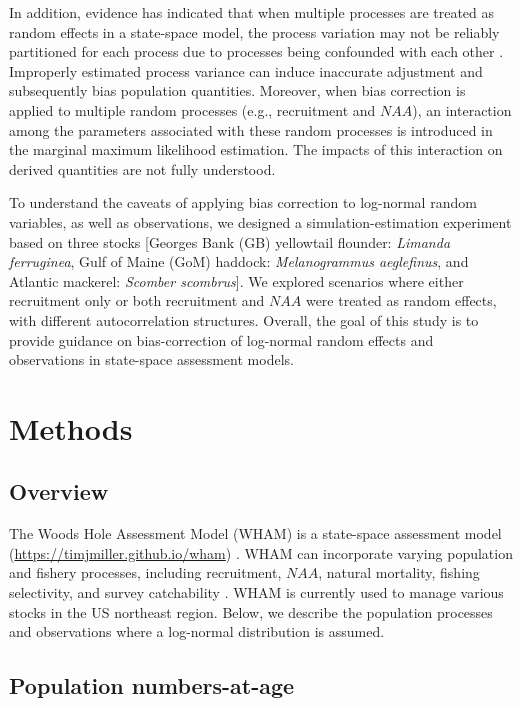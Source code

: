 \documentclass[
  12pt,
]{article}
\begin{document}
In addition, evidence has indicated that when multiple processes are
treated as random effects in a state-space model, the process variation
may not be reliably partitioned for each process due to processes being
confounded with each other
\citep{Trijoulet2020, Li2024, Liljestrand2024}. Improperly estimated
process variance can induce inaccurate adjustment and subsequently bias
population quantities. Moreover, when bias correction is applied to
multiple random processes (e.g., recruitment and \(NAA\)), an
interaction among the parameters associated with these random processes
is introduced in the marginal maximum likelihood estimation. The impacts
of this interaction on derived quantities are not fully understood.

To understand the caveats of applying bias correction to log-normal
random variables, as well as observations, we designed a
simulation-estimation experiment based on three stocks {[}Georges Bank
(GB) yellowtail flounder: \emph{Limanda ferruginea}, Gulf of Maine (GoM)
haddock: \emph{Melanogrammus aeglefinus}, and Atlantic mackerel:
\emph{Scomber scombrus}{]}. We explored scenarios where either
recruitment only or both recruitment and \(NAA\) were treated as random
effects, with different autocorrelation structures. Overall, the goal of
this study is to provide guidance on bias-correction of log-normal
random effects and observations in state-space assessment models.

\section{Methods}\label{methods}

\subsection{Overview}\label{overview}

The Woods Hole Assessment Model (WHAM) is a state-space assessment model
(\url{https://timjmiller.github.io/wham}) \citep{Stock2021}. WHAM can
incorporate varying population and fishery processes, including
recruitment, \(NAA\), natural mortality, fishing selectivity, and survey
catchability \citep{Stock2021}. WHAM is currently used to manage various
stocks in the US northeast region. Below, we describe the population
processes and observations where a log-normal distribution is assumed.

\subsection{Population numbers-at-age}\label{population-numbers-at-age}
\end{document}
